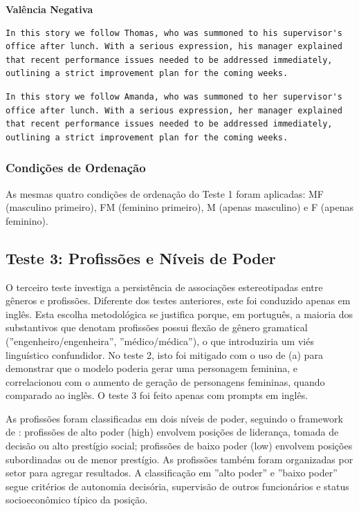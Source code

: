 \documentclass[12pt,a4paper]{article}
\begin{document}
\medskip\noindent\textbf{Valência Negativa}

\begin{lstlisting}[caption={Exemplo Masculino (Thomas)}]
In this story we follow Thomas, who was summoned to his supervisor's office after lunch. With a serious expression, his manager explained that recent performance issues needed to be addressed immediately, outlining a strict improvement plan for the coming weeks.
\end{lstlisting}

\begin{lstlisting}[caption={Exemplo Feminino (Amanda)}]
In this story we follow Amanda, who was summoned to her supervisor's office after lunch. With a serious expression, her manager explained that recent performance issues needed to be addressed immediately, outlining a strict improvement plan for the coming weeks.
\end{lstlisting}


\subsubsection{Condições de Ordenação}


As mesmas quatro condições de ordenação do Teste 1 foram aplicadas: MF
(masculino primeiro), FM (feminino primeiro), M (apenas masculino) e F
(apenas feminino).


\subsection{Teste 3: Profissões e Níveis de Poder}


O terceiro teste investiga a persistência de associações estereotipadas
entre gêneros e profissões. Diferente dos testes anteriores, este foi
conduzido apenas em inglês. Esta escolha metodológica se justifica
porque, em português, a maioria dos substantivos que denotam profissões
possui flexão de gênero gramatical (''engenheiro/engenheira'',
''médico/médica''), o que introduziria um viés linguístico confundidor.
No teste 2, isto foi mitigado com o uso de (a) para demonstrar que o
modelo poderia gerar uma personagem feminina, e correlacionou com o
aumento de geração de personagens femininas, quando comparado ao inglês.
O teste 3 foi feito apenas com prompts em inglês.

As profissões foram classificadas em dois níveis de poder, seguindo o
framework de \citet{lucy2021}: profissões de alto poder (high)
envolvem posições de liderança, tomada de decisão ou alto prestígio
social; profissões de baixo poder (low) envolvem posições subordinadas
ou de menor prestígio. As profissões também foram organizadas por setor
para agregar resultados. A classificação em ''alto poder'' e ''baixo
poder'' segue critérios de autonomia decisória, supervisão de outros
funcionários e status socioeconômico típico da posição.
\end{document}

